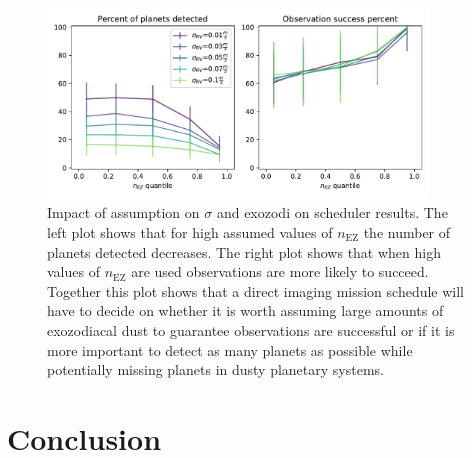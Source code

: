 \begin{figure}
  \begin{center}
    \includegraphics[width=0.9\textwidth]{ch4/figures/succes_rate_vs_percent_detected.pdf}
  \end{center}
  \caption{
    Impact of assumption on $\sigma$ and exozodi on scheduler results. The left plot shows
    that for high assumed values of $n_\textrm{EZ}$ the number of planets detected decreases.
    The right plot shows that when high values of $n_\textrm{EZ}$ are used observations are
    more likely to succeed. Together this plot shows that a direct imaging mission schedule
    will have to decide on whether it is worth assuming large amounts of exozodiacal dust
    to guarantee observations are successful or if it is more important to detect as many
    planets as possible while potentially missing planets in dusty planetary systems.
  }
  \label{fig:sigma_nEZ_impact_plots}
\end{figure}

\section{Conclusion}

